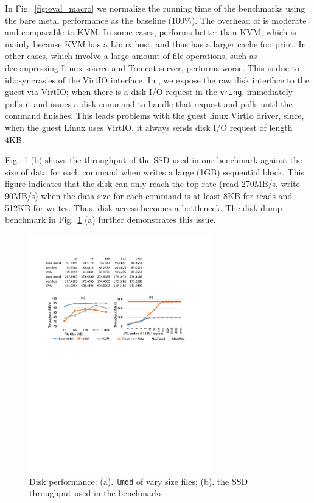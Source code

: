 In Fig.~\ref{fig:eval_macro} we normalize the running time of the benchmarks
using the bare metal performance as the baseline (100\%). The overhead of
\mCTOShyper{} is moderate and comparable to KVM. In some cases, \mCTOShyper{}
performs better than KVM, which is mainly because KVM has a Linux host, and thus has a
larger cache footprint. In other cases, which involve a large amount of file
operations, such as decompressing Linux source and Tomcat server, \mCTOShyper{}
performs worse. This is due to idiosyncrasies of the VirtIO interface. In
\mCTOShyper{}, we expose the raw disk interface to the guest via VirtIO; when
there is a disk I/O request in the \texttt{vring}, \mCTOShyper{} immediately
pulls it and issues a disk command to handle that request and polls until the
command finishes. This leads problems with the guest linux VirtIo driver, since,
when the guest Linux uses VirtIO, it always sends disk I/O request of length
4KB.

Fig.~\ref{fig:eval_disk} (b) shows the throughput of the SSD used in our
benchmark against the size of data for each command when writes a large (1GB)
sequential block. This figure indicates that the disk can only reach the top
rate (read 270MB/s, write 90MB/s) when the data size for each command is at
least 8KB for reads and 512KB for writes.
Thus, disk access becomes a bottleneck.
The disk dump benchmark in Fig.~\ref{fig:eval_disk} (a)
further demonstrates this issue.

\begin{figure}
	\begin{center}
		\vspace{-.2cm}
		\hspace{-.2cm}
		\includegraphics[width=8cm]{figs/disk.pdf}
		\hspace{-.2cm}
		\vspace{.0cm}
		\caption{Disk performance: (a). \texttt{lmdd} of vary size files; (b). the SSD throughput used in the benchmarks}
		\label{fig:eval_disk}
	\end{center}
\end{figure}


